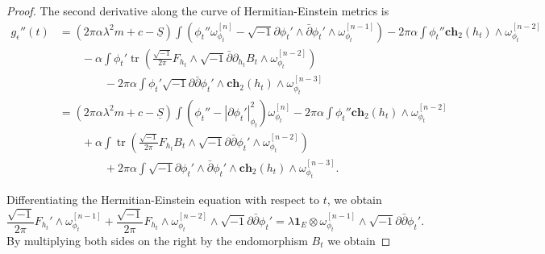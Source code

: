 \documentclass[10pt, letterpaper]{amsart}
\newcommand{\tr}{\operatorname{tr}}
\theoremstyle{plain}
\theoremstyle{definition}
\numberwithin{equation}{section}
\begin{document}
\begin{proof}
	The second derivative along the curve of Hermitian-Einstein metrics is 
	\begin{equation}
	\label{eqn:second-upper-bound}
	\begin{split}
	g_\epsilon''(t)
	& = 
	(2\pi \alpha\lambda^2 m +c-\underline{S}) \int \left( 
	\phi_t'' \omega_{\phi_t}^{[n]} 
	- 
	\sqrt{-1}\partial\phi_t'\wedge \bar\partial\phi_t'\wedge \omega_{\phi_t}^{[n-1]}	\right)
	- 
	2\pi\alpha \int \phi_t'' \mathbf{ch}_2\left(h_t\right)\wedge \omega_{\phi_t}^{[n-2]}\\
	& \qquad
	- \alpha\int \phi_t' \tr 
	\left( \frac{\sqrt{-1}}{2\pi}F_{h_t}\wedge 
	\sqrt{-1}\bar\partial \partial_{h_t} B_t\wedge \omega_{\phi_t}^{[n-2]}\right)\\
	& \qquad\qquad
	- 
	2\pi \alpha \int\phi_t'\sqrt{-1}\partial\bar\partial \phi_t'\wedge \mathbf{ch}_2\left(h_t\right)\wedge \omega_{\phi_t}^{[n-3]}\\
	& = 
(2\pi \alpha\lambda^2 m+c-\underline{S}) \int \left( 
\phi_t'' 
- 
\left|\partial \phi_t'\right|^2_{\phi_t}	\right)\omega_{\phi_t}^{[n]} 
- 
2\pi\alpha \int \phi_t'' \mathbf{ch}_2\left(h_t\right)\wedge \omega_{\phi_t}^{[n-2]}\\
& \qquad
+ \alpha \int  \tr 
\left( \frac{\sqrt{-1}}{2\pi}F_{h_t}  B_t\wedge \sqrt{-1}\partial\bar\partial \phi_t'\wedge \omega_{\phi_t}^{[n-2]}\right)\\
& \qquad\qquad 
+
2\pi \alpha \int\sqrt{-1}\partial\phi_t'\wedge\bar\partial \phi_t'\wedge \mathbf{ch}_2\left(h_t\right)\wedge \omega_{\phi_t}^{[n-3]}. 
	\end{split}
	\end{equation}
	
Differentiating the Hermitian-Einstein equation with respect to $t$, we obtain 
\[
\frac{\sqrt{-1}}{2\pi}F_{h_t}' \wedge \omega_{\phi_t}^{[n-1]}
+ 
\frac{\sqrt{-1}}{2\pi}F_{h_t}\wedge \omega_{\phi_t}^{[n-2]}\wedge \sqrt{-1}\partial\bar\partial \phi_t'
= 
\lambda \mathbf{1}_E \otimes \omega_{\phi_t}^{[n-1]}\wedge \sqrt{-1}\partial\bar\partial \phi_t'.
\]	
By multiplying both sides on the right by the endomorphism $B_t$ we obtain 


\end{proof}
\end{document}
